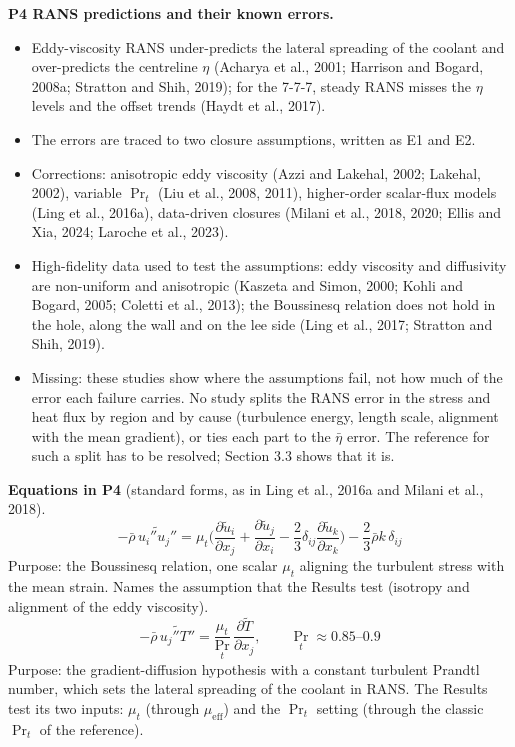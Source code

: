 \documentclass[10pt]{article}
\begin{document}
\textbf{P4 RANS predictions and their known errors.}
\begin{itemize}
\item Eddy-viscosity RANS under-predicts the lateral spreading of the coolant and over-predicts the centreline
  $\eta$ (Acharya et al., 2001; Harrison and Bogard, 2008a; Stratton and Shih, 2019); for the 7-7-7, steady RANS
  misses the $\eta$ levels and the offset trends (Haydt et al., 2017).
\item The errors are traced to two closure assumptions, written as E1 and E2.
\item Corrections: anisotropic eddy viscosity (Azzi and Lakehal, 2002; Lakehal, 2002), variable $\Pr_t$ (Liu et
  al., 2008, 2011), higher-order scalar-flux models (Ling et al., 2016a), data-driven closures (Milani et al.,
  2018, 2020; Ellis and Xia, 2024; Laroche et al., 2023).
\item High-fidelity data used to test the assumptions: eddy viscosity and diffusivity are non-uniform and
  anisotropic (Kaszeta and Simon, 2000; Kohli and Bogard, 2005; Coletti et al., 2013); the Boussinesq relation
  does not hold in the hole, along the wall and on the lee side (Ling et al., 2017; Stratton and Shih, 2019).
\item Missing: these studies show where the assumptions fail, not how much of the error each failure carries.
  No study splits the RANS error in the stress and heat flux by region and by cause (turbulence energy, length
  scale, alignment with the mean gradient), or ties each part to the $\bar\eta$ error. The reference for such a
  split has to be resolved; Section 3.3 shows that it is.
\end{itemize}

\textbf{Equations in P4} (standard forms, as in Ling et al., 2016a and Milani et al., 2018).
\begin{equation}
-\bar\rho\,\widetilde{u_i''u_j''}=\mu_t\Big(\frac{\partial\tilde u_i}{\partial x_j}+\frac{\partial\tilde u_j}{\partial x_i}
-\frac{2}{3}\delta_{ij}\frac{\partial\tilde u_k}{\partial x_k}\Big)-\frac{2}{3}\bar\rho k\,\delta_{ij}
\tag{E1}
\end{equation}
Purpose: the Boussinesq relation, one scalar $\mu_t$ aligning the turbulent stress with the mean strain. Names
the assumption that the Results test (isotropy and alignment of the eddy viscosity).
\begin{equation}
-\bar\rho\,\widetilde{u_j''T''}=\frac{\mu_t}{\Pr_t}\,\frac{\partial\tilde T}{\partial x_j},\qquad \Pr_t\approx0.85\text{--}0.9
\tag{E2}
\end{equation}
Purpose: the gradient-diffusion hypothesis with a constant turbulent Prandtl number, which sets the lateral
spreading of the coolant in RANS. The Results test its two inputs: $\mu_t$ (through $\mu_{\mathrm{eff}}$) and the
$\Pr_t$ setting (through the classic $\Pr_t$ of the reference).
\end{document}
